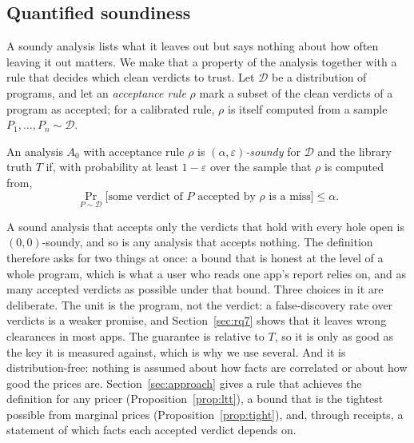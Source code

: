 \subsection{Quantified soundiness}
\label{sec:def}
A soundy analysis lists what it leaves out but says nothing about how often leaving it out matters.
We make that a property of the analysis together with a rule that decides which clean verdicts to trust.
Let $\mathcal{D}$ be a distribution of programs, and let an \emph{acceptance rule} $\rho$ mark a subset of the clean verdicts of a program as accepted; for a calibrated rule, $\rho$ is itself computed from a sample $P_1,\dots,P_n\sim\mathcal{D}$.
\begin{definition}\label{def:soundy}
An analysis $A_0$ with acceptance rule $\rho$ is \emph{$(\alpha,\varepsilon)$-soundy} for $\mathcal{D}$ and the library truth $T$ if, with probability at least $1-\varepsilon$ over the sample that $\rho$ is computed from,
\[\Pr_{P\sim\mathcal{D}}\bigl[\text{some verdict of $P$ accepted by $\rho$ is a miss}\bigr]\le\alpha.\]
\end{definition}
\noindent A sound analysis that accepts only the verdicts that hold with every hole open is $(0,0)$-soundy, and so is any analysis that accepts nothing.
The definition therefore asks for two things at once: a bound that is honest at the level of a whole program, which is what a user who reads one app's report relies on, and as many accepted verdicts as possible under that bound.
Three choices in it are deliberate.
The unit is the program, not the verdict: a false-discovery rate over verdicts is a weaker promise, and Section~\ref{sec:rq7} shows that it leaves wrong clearances in most apps.
The guarantee is relative to $T$, so it is only as good as the key it is measured against, which is why we use several.
And it is distribution-free: nothing is assumed about how facts are correlated or about how good the prices are.
Section~\ref{sec:approach} gives a rule that achieves the definition for any pricer (Proposition~\ref{prop:ltt}), a bound that is the tightest possible from marginal prices (Proposition~\ref{prop:tight}), and, through receipts, a statement of which facts each accepted verdict depends on.

